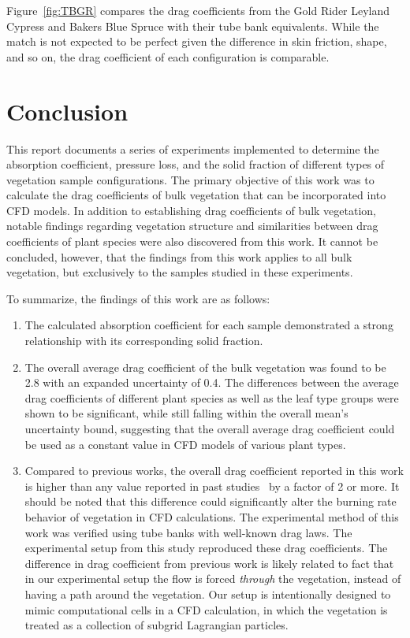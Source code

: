 \documentclass[12pt]{article}
\begin{document}
Figure~\ref{fig:TBGR} compares the drag coefficients from the Gold Rider Leyland Cypress and Bakers Blue Spruce with their tube bank equivalents. While the match is not expected to be perfect given the difference in skin friction, shape, and so on, the drag coefficient of each configuration is comparable.
\pagebreak

\section{Conclusion}

This report documents a series of experiments implemented to determine the absorption coefficient, pressure loss, and the solid fraction of different types of vegetation sample configurations. The primary objective of this work was to calculate the drag coefficients of bulk vegetation that can be incorporated into CFD models. In addition to establishing drag coefficients of bulk  vegetation, notable findings regarding vegetation structure and similarities between drag coefficients of plant species were also discovered from this work. It cannot be concluded, however, that the findings from this work applies to all bulk vegetation, but exclusively to the samples studied in these experiments.

To summarize, the findings of this work are as follows:

\begin{enumerate}
  \item The calculated absorption coefficient for each sample demonstrated a strong relationship with its corresponding solid fraction.
  \item The overall average drag coefficient of the bulk vegetation was found to be 2.8 with an expanded uncertainty of 0.4. The differences between the average drag coefficients of different plant species as well as the leaf type groups were shown to be significant, while still falling within the overall mean's uncertainty bound, suggesting that the overall average drag coefficient could be used as a constant value in CFD models of various plant types.
\item Compared to previous works, the overall drag coefficient reported in this work is higher than any value reported in past studies~\cite{Cao2012,Jalonen2014,Mayhead1973,Gillies2002,Ishikawa2006} by a factor of 2 or more.  It should be noted that this difference could significantly alter the burning rate behavior of vegetation in CFD calculations. The experimental method of this work was verified using tube banks with well-known drag laws.  The experimental setup from this study reproduced these drag coefficients.  The difference in drag coefficient from previous work is likely related to fact that in our experimental setup the flow is forced \emph{through} the vegetation, instead of having a path around the vegetation.  Our setup is intentionally designed to mimic computational cells in a CFD calculation, in which the vegetation is treated as a collection of subgrid Lagrangian particles.
\end{enumerate}
\end{document}

